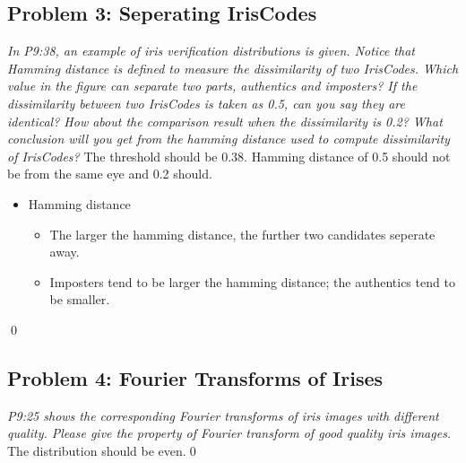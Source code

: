 \documentclass[
        ]{beamer}
\begin{document}
    \subsection{Problem 3: Seperating IrisCodes}
    
    		\begin{frame}[t]{\subsecname}
    			\begin{overprint}
    			\emph{In P9:38, an example of iris verification distributions is given. Notice that Hamming distance is defined to measure the dissimilarity of two IrisCodes. Which value in the figure can separate two parts, authentics and imposters? If the dissimilarity between two IrisCodes is taken as 0.5, can you say they are identical? How about the comparison result when the dissimilarity is 0.2? What conclusion will you get from the hamming distance used to compute dissimilarity of IrisCodes?}
    			\onslide<2> 
    			The threshold should be 0.38. Hamming distance of 0.5 should not be from the same eye and 0.2 should.
    			\onslide<3>
    				\begin{itemize}
    				\item Hamming distance
    					\begin{itemize}
    					\item The larger the hamming distance, the further two candidates seperate away.
    					\item Imposters tend to be larger the hamming distance; the authentics tend to be smaller.
    					\end{itemize}		
    				\end{itemize}\qed	
    			\end{overprint}
    		\end{frame}
    		
    \subsection{Problem 4: Fourier Transforms of Irises}
    
    		\begin{frame}[t]{\subsecname}
    			\begin{overprint}
    			\onslide<1>
    			\emph{P9:25 shows the corresponding Fourier transforms of iris images with different quality. Please give the property of Fourier transform of good quality iris images.}
    			\onslide<2> \inpdfc{9}{25} 
    			The distribution should be even.\qed	
    			\end{overprint}
    		\end{frame}   
    		
\end{document}
